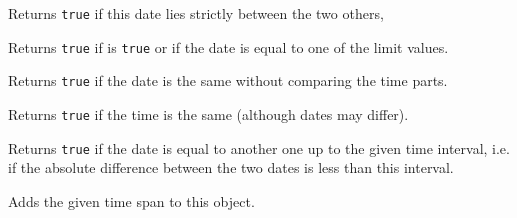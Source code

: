 Returns {\tt true} if this date lies strictly between the two others,




\label{wxdatetimeisbetween}


Returns {\tt true} if 
is {\tt true} or if the date is equal to one of the limit values.




\label{wxdatetimeissamedate}


Returns {\tt true} if the date is the same without comparing the time parts.


\label{wxdatetimeissametime}


Returns {\tt true} if the time is the same (although dates may differ).


\label{wxdatetimeisequalupto}


Returns {\tt true} if the date is equal to another one up to the given time
interval, i.e. if the absolute difference between the two dates is less than
this interval.



\label{wxdatetimeaddts}




Adds the given time span to this object.




